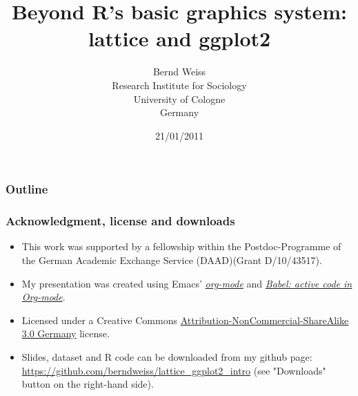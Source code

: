\documentclass[bigger]{beamer}
\begin{document}
\title{Beyond R's basic graphics system: lattice and ggplot2}
\author{Bernd Weiss\\Research Institute for Sociology\\University of Cologne\\Germany\\}
\date{21/01/2011 \vfill \byncsa}
\maketitle

\begin{frame}
\frametitle{Outline}
\setcounter{tocdepth}{3}
\tableofcontents
\end{frame}





\newcommand{\infobox}[1]{
  \vfill\vfill\hrule
  \begin{columns}[t]
    \begin{column}{0.02\textwidth}
      \Info
    \end{column}
    \begin{column}[T]{0.97\textwidth}
      \tiny{#1}
    \end{column}
\end{columns}}



\begin{frame}\frametitle{Acknowledgment, license and downloads}
\begin{itemize}
\item This work was supported by a fellowship within the Postdoc-Programme of the German Academic
  Exchange Service (DAAD)(Grant D/10/43517).
\item My presentation was created using Emacs' \href{http://orgmode.org/}{\emph{org-mode}} and
\href{http://orgmode.org/worg/org-contrib/babel/}{\emph{Babel: active code in
Org-mode}}. 
\item Licensed under a Creative Commons
\href{http://creativecommons.org/licenses/by-nc-sa/3.0/de/deed.en}{Attribution-NonCommercial-ShareAlike
3.0 Germany} license.
\item Slides, dataset and R code can be downloaded from my github page:
\href{https://github.com/berndweiss/lattice_ggplot2_intro}{https://github.com/berndweiss/lattice_ggplot2_intro} (see
"Downloads" button on the right-hand side).
\end{itemize}
\end{frame}
\end{document}
